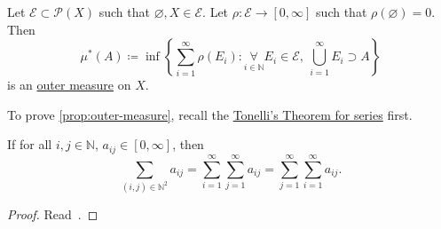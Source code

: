 \begin{proposition}\label{prop:outer-measure}
	Let \(\mathcal{E} \subset \mathcal{P} (X)\) such that \(\varnothing, X \in  \mathcal{E} \). Let \(\rho\colon \mathcal{E} \to [0, \infty ]\) such that \(\rho(\varnothing ) = 0\). Then
	\[
		\mu^{\ast} (A) \coloneqq \inf\left\{\sum_{i=1}^{\infty} \rho(E_{i})\colon \underset{i\in \mathbb{N} }{\forall}E_{i}\in \mathcal{E},\ \bigcup_{i=1}^{\infty} E_{i}\supset A\right\}
	\]
	is an \hyperref[def:outer-measure]{outer measure} on \(X\).
\end{proposition}

To prove \autoref{prop:outer-measure}, recall the \href{https://en.wikipedia.org/wiki/Fubini\%27s_theorem}{Tonelli's Theorem for series} first.

\begin{theorem}\label{thm:Tonelli-theorem-for-series}
	If for all \(i, j\in \mathbb{N} \), \(a_{ij}\in [0, \infty ]\), then
	\[
		\sum_{(i, j)\in\mathbb{N} ^2}a_{ij} = \sum_{i=1}^{\infty} \sum_{j=1}^{\infty} a_{ij} = \sum_{j=1}^{\infty} \sum_{i=1}^{\infty} a_{ij}.
	\]
\end{theorem}
\begin{proof}
	Read~\cite[Theorem 0.0.2]{tao2013introduction}.
\end{proof}